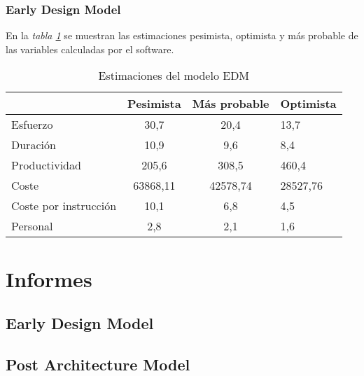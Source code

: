 \documentclass[11pt,a4paper,spanish,twoside]{book}
\begin{document}
\subsection{Early Design Model}
En la \emph{tabla \ref{Tab:EstEDM}} se muestran las estimaciones pesimista,
optimista y más probable de las variables calculadas por el software.
\begin{table}[!h]
  \centering
  \begin{tabular}{p{4.5cm}|c|c|b{2cm}<{\centering}}
    & \textbf{Pesimista} & \textbf{Más probable} & \textbf{Optimista}\\
    \hline \hline
    Esfuerzo & 30,7 & 20,4 & 13,7 \\ \hline
    Duración & 10,9 & 9,6 & 8,4 \\ \hline
    Productividad & 205,6 & 308,5 & 460,4 \\ \hline
    Coste & 63868,11 & 42578,74 & 28527,76 \\ \hline
    Coste por instrucción & 10,1 & 6,8 & 4,5 \\ \hline
    Personal & 2,8 & 2,1 & 1,6 \\ \hline
  \end{tabular}
  \caption{Estimaciones del modelo EDM} \label{Tab:EstEDM}
\end{table}

\chapter{Informes}
\section{Early Design Model}
\section{Post Architecture Model}
\end{document}

